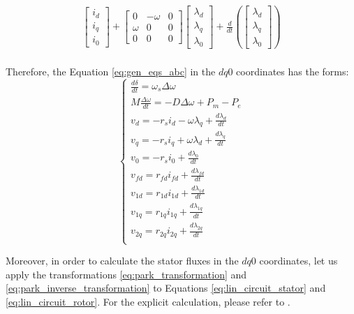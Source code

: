 \begin{equation*}
\begin{aligned}
        \begin{bmatrix}
            i_d \\ i_q \\ i_0
        \end{bmatrix}
        +
        \begin{bmatrix}
            0 & -\omega & 0 \\
            \omega & 0 & 0 \\
            0 & 0 & 0
        \end{bmatrix}\begin{bmatrix}\lambda_d \\ \lambda_q\\ \lambda_0\end{bmatrix}
        +
        \frac{d}{dt} \left(\begin{bmatrix}\lambda_d \\ \lambda_q\\ \lambda_0\end{bmatrix}\right) \\ 
    \end{aligned}
\end{equation*}

Therefore, the Equation \ref{eq:gen_eqs_abc} in the $dq0$ coordinates has the forms:
\begin{equation}
    \begin{cases}
        \frac{d\delta}{dt} = \omega_s \Delta\omega\\
        M\frac{\Delta\omega}{dt} = -D\Delta\omega + P_m - P_e\\
        v_d = -r_s i_d - \omega\lambda_q + \frac{d\lambda_d}{dt}\\
        v_q = -r_s i_q + \omega\lambda_d + \frac{d\lambda_q}{dt}\\
        v_0 = -r_s i_0 + \frac{d\lambda_0}{dt}\\
        v_{fd} = r_{fd} i_{fd} + \frac{d\lambda_{fd}}{dt}\\
        v_{1d} = r_{1d} i_{1d} + \frac{d\lambda_{1d}}{dt}\\
        v_{1q} = r_{1q} i_{1q} + \frac{d\lambda_{1q}}{dt}\\
        v_{2q} = r_{2q} i_{2q} + \frac{d\lambda_{2q}}{dt}\\
    \end{cases}
    \label{eq:gen_eqs_dq0}
\end{equation}

Moreover, in order to calculate the stator fluxes in the $dq0$ coordinates, let
us apply the transformations \ref{eq:park_transformation} and
\ref{eq:park_inverse_transformation} to Equations \ref{eq:lin_circuit_stator}
and \ref{eq:lin_circuit_rotor}. For the explicit calculation, please refer to
\cite{krause2002analysis}.


